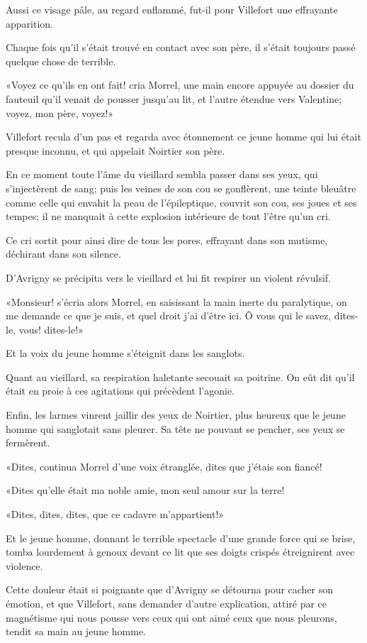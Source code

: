 Aussi ce visage pâle, au regard enflammé, fut-il pour Villefort une effrayante apparition. 

Chaque fois qu'il s'était trouvé en contact avec son père, il s'était toujours passé quelque chose de terrible. 

«Voyez ce qu'ils en ont fait! cria Morrel, une main encore appuyée au dossier du fauteuil qu'il venait de pousser jusqu'au lit, et l'autre étendue vers Valentine; voyez, mon père, voyez!» 

Villefort recula d'un pas et regarda avec étonnement ce jeune homme qui lui était presque inconnu, et qui appelait Noirtier son père. 

En ce moment toute l'âme du vieillard sembla passer dans ses yeux, qui s'injectèrent de sang; puis les veines de son cou se gonflèrent, une teinte bleuâtre comme celle qui envahit la peau de l'épileptique, couvrit son cou, ses joues et ses tempes; il ne manquait à cette explosion intérieure de tout l'être qu'un cri. 

Ce cri sortit pour ainsi dire de tous les pores, effrayant dans son mutisme, déchirant dans son silence. 

D'Avrigny se précipita vers le vieillard et lui fit respirer un violent révulsif. 

«Monsieur! s'écria alors Morrel, en saisissant la main inerte du paralytique, on me demande ce que je suis, et quel droit j'ai d'être ici. Ô vous qui le savez, dites-le, vous! dites-le!» 

Et la voix du jeune homme s'éteignit dans les sanglots. 

Quant au vieillard, sa respiration haletante secouait sa poitrine. On eût dit qu'il était en proie à ces agitations qui précèdent l'agonie. 

Enfin, les larmes vinrent jaillir des yeux de Noirtier, plus heureux que le jeune homme qui sanglotait sans pleurer. Sa tête ne pouvant se pencher, ses yeux se fermèrent. 

«Dites, continua Morrel d'une voix étranglée, dites que j'étais son fiancé! 

«Dites qu'elle était ma noble amie, mon seul amour sur la terre! 

«Dites, dites, dites, que ce cadavre m'appartient!» 

Et le jeune homme, donnant le terrible spectacle d'une grande force qui se brise, tomba lourdement à genoux devant ce lit que ses doigts crispés étreignirent avec violence. 

Cette douleur était si poignante que d'Avrigny se détourna pour cacher son émotion, et que Villefort, sans demander d'autre explication, attiré par ce magnétisme qui nous pousse vers ceux qui ont aimé ceux que nous pleurons, tendit sa main au jeune homme. 

